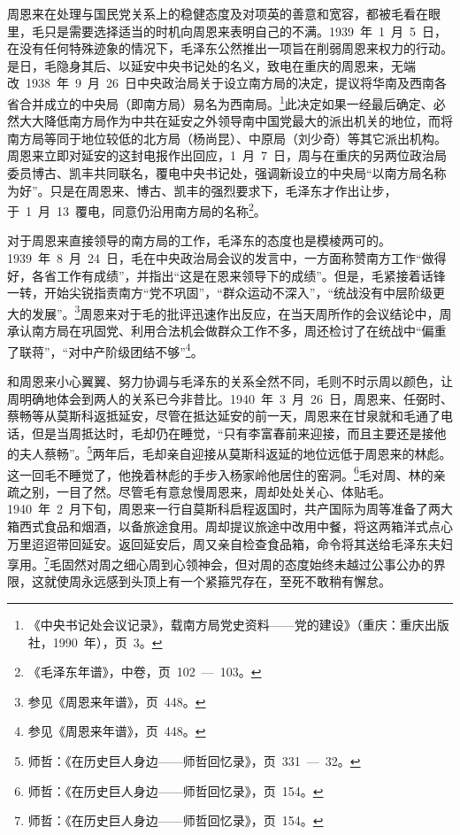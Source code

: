 周恩来在处理与国民党关系上的稳健态度及对项英的善意和宽容，都被毛看在眼里，毛只是需要选择适当的时机向周恩来表明自己的不满。1939~年~1~月~5~日，在没有任何特殊迹象的情况下，毛泽东公然推出一项旨在削弱周恩来权力的行动。是日，毛隐身其后、以延安中央书记处的名义，致电在重庆的周恩来，无端改~1938~年~9~月~26~日中央政治局关于设立南方局的决定，提议将华南及西南各省合并成立的中央局（即南方局）易名为西南局。\footnote{《中央书记处会议记录》，载南方局党史资料——党的建设》（重庆：重庆出版社，1990~年），页~3。}此决定如果一经最后确定、必然大大降低南方局作为中共在延安之外领导南中国党最大的派出机关的地位，而将南方局等同于地位较低的北方局（杨尚昆）、中原局（刘少奇）等其它派出机构。周恩来立即对延安的这封电报作出回应，1~月~7~日，周与在重庆的另两位政治局委员博古、凯丰共同联名，覆电中央书记处，强调新设立的中央局“以南方局名称为好”。只是在周恩来、博古、凯丰的强烈要求下，毛泽东才作出让步，于~1~月~13~覆电，同意仍沿用南方局的名称\footnote{《毛泽东年谱》，中卷，页~102~—~103。}。

对于周恩来直接领导的南方局的工作，毛泽东的态度也是模棱两可的。1939~年~8~月~24~日，毛在中央政治局会议的发言中，一方面称赞南方工作“做得好，各省工作有成绩”，并指出“这是在恩来领导下的成绩”。但是，毛紧接着话锋一转，开始尖锐指责南方“党不巩固”，“群众运动不深入”，“统战没有中层阶级更大的发展”。\footnote{参见《周恩来年谱》，页~448。}周恩来对于毛的批评迅速作出反应，在当天周所作的会议结论中，周承认南方局在巩固党、利用合法机会做群众工作不多，周还检讨了在统战中“偏重了联蒋”，“对中产阶级团结不够”\footnote{参见《周恩来年谱》，页~448。}。

和周恩来小心翼翼、努力协调与毛泽东的关系全然不同，毛则不时示周以颜色，让周明确地体会到两人的关系已今非昔比。1940~年~3~月~26~日，周恩来、任弼时、蔡畅等从莫斯科返抵延安，尽管在抵达延安的前一天，周恩来在甘泉就和毛通了电话，但是当周抵达时，毛却仍在睡觉，“只有李富春前来迎接，而且主要还是接他的夫人蔡畅”。\footnote{师哲：《在历史巨人身边——师哲回忆录》，页~331~—~32。}两年后，毛却亲自迎接从莫斯科返延的地位远低于周恩来的林彪。这一回毛不睡觉了，他挽着林彪的手步入杨家岭他居住的窑洞。\footnote{师哲：《在历史巨人身边——师哲回忆录》，页~154。}毛对周、林的亲疏之别，一目了然。尽管毛有意怠慢周恩来，周却处处关心、体贴毛。1940~年~2~月下旬，周恩来一行自莫斯科启程返国时，共产国际为周等准备了两大箱西式食品和烟酒，以备旅途食用。周却提议旅途中改用中餐，将这两箱洋式点心万里迢迢带回延安。返回延安后，周又亲自检查食品箱，命令将其送给毛泽东夫妇享用。\footnote{师哲：《在历史巨人身边——师哲回忆录》，页~154。}毛固然对周之细心周到心领神会，但对周的态度始终未越过公事公办的界限，这就使周永远感到头顶上有一个紧箍咒存在，至死不敢稍有懈怠。

